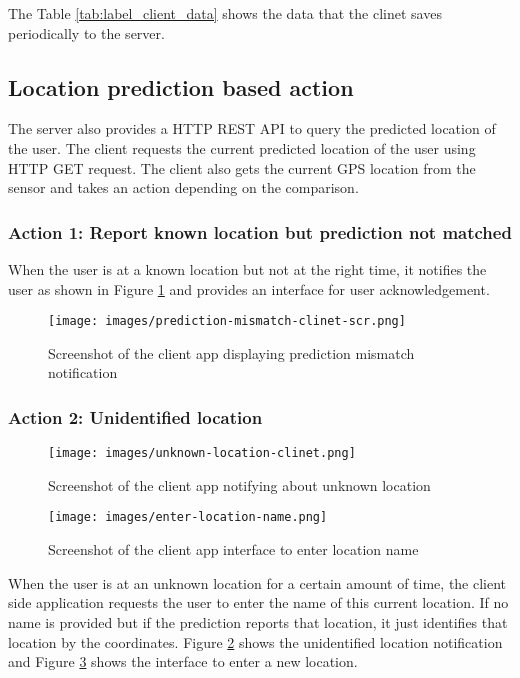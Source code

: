 \documentclass[conference]{IEEEtran}
\begin{document}
The Table \ref{tab:label_client_data} shows the data that the clinet saves periodically to the server.

\subsection{Location prediction based action}
The server also provides a HTTP REST API to query the predicted location of the user. The client requests the current predicted location of the user using HTTP GET request. The client also gets the current GPS location from the sensor and takes an action depending on the comparison.

\subsubsection{Action 1: Report known location but prediction not matched}
When the user is at a known location but not at the right time, it notifies the user as shown in Figure \ref{fig:clinet_prediction_mismatch} and provides an interface for user acknowledgement.

\begin{figure}[h]
  \centering
  \texttt{[image: images/prediction-mismatch-clinet-scr.png]}
  \caption[Prediction Mismatch]
   {Screenshot of the client app displaying prediction mismatch notification}
   \label{fig:clinet_prediction_mismatch}
\end{figure}

\subsubsection{Action 2: Unidentified location}

\begin{figure}[h]
  \centering
  \texttt{[image: images/unknown-location-clinet.png]}
  \caption[Notifying unknown location]
   {Screenshot of the client app notifying about unknown location}
   \label{fig:clinet_notify_unknown_location}
\end{figure}

\begin{figure}[h]
  \centering
  \texttt{[image: images/enter-location-name.png]}
  \caption[Request Location Identity]
   {Screenshot of the client app interface to enter location name}
   \label{fig:clinet_enter_location}
\end{figure}

When the user is at an unknown location for a certain amount of time, the client side application requests the user to enter the name of this current location. If no name is provided but if the prediction reports that location, it just identifies that location by the coordinates. Figure \ref{fig:clinet_notify_unknown_location} shows the unidentified location notification and Figure \ref{fig:clinet_enter_location} shows the interface to enter a new location.
\end{document}
